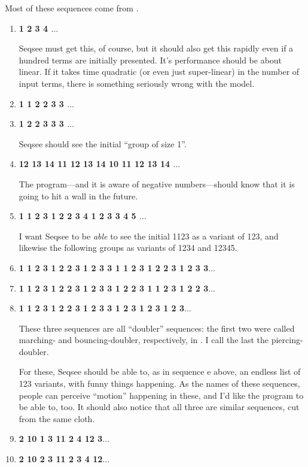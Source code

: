 Most of these sequences come from \cite[Chapter 1]{Hofstadter:FCCA}.

\renewcommand{\theenumi}{\alph{enumi}}
\begin{enumerate}
\item \textbf{1 2 3 4 $\ldots$}

Seqsee must get this, of course, but it should also get this rapidly even if a hundred terms are initially presented. It's performance should be about linear. If it takes time quadratic (or even just super-linear) in the number of input terms, there is something seriously wrong with the model.

\item \textbf{ 1 1 2 2 3 3 $\ldots$}
\item \textbf{ 1 2 2 3 3 3 $\ldots$}

Seqsee should see the initial ``group of size 1''.

\item \textbf{12 13 14 11 12 13 14 10 11 12 13 14 $\ldots$}

The program---and it is aware of negative numbers---should know that it is going to hit a wall in the future.

\item \textbf{1 1 2 3 1 2 2 3 4 1 2 3 3 4 5 $\ldots$}

I want Seqsee to be \emph{able} to see the initial 1123 as a variant of 123, and likewise the following groups as variants of 1234 and 12345.

\item \textbf{1 1 2 3 1 2 2 3 1 2 3 3 1 1 2 3 1 2 2 3 1 2 3 3$\ldots$}
\item \textbf{1 1 2 3 1 2 2 3 1 2 3 3 1 2 2 3 1 1 2 3 1 2 2 3$\ldots$}
\item \textbf{1 1 2 3 1 2 2 3 1 2 3 3 1 2 3 1 2 3 1 2 3$\ldots$}

These three sequences are all ``doubler'' sequences: the first two were called marching- and bouncing-doubler, respectively, in \cite{Hofstadter:FCCA}. I call the last the piercing-doubler.

For these, Seqsee should be able to, as in sequence e above, an endless list of 123 variants, with funny things happening. As the names of these sequences, people can perceive ``motion'' happening in these, and I'd like the program to be able to, too. It should also notice that all three are similar sequences, cut from the same cloth.

\item \textbf{ 2 10 1 3 11 2 4 12 3$\ldots$}
\item \textbf{ 2 10 2 3 11 2 3 4 12$\ldots$}


\end{enumerate}
